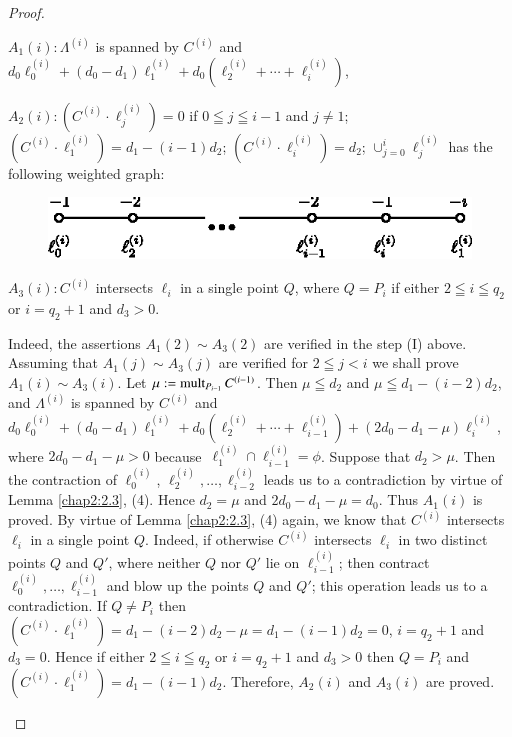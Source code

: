 \begin{proof}
\begin{enumerate}
  $A_{1}(i):\Lambda^{(i)}$ is spanned by $C^{(i)}$ and 
  $d_{0}\ell_{0}^{(i)}+(d_{0}- d_{1})\ell_{1}^{(i)}+
  d_{0}(\ell^{(i)}_{2} +\cdots+\ell_{i}^{(i)})$,  

$A_{2}(i):(C^{(i)}\cdot \ell^{(i)}_{j})=0$ if $0\leqq j\leqq i-1$ and
  $j\neq 1$; $(C^{(i)}\cdot \ell^{(i)}_{1})=d_{1}-(i-1)d_{2}$;
  $(C^{(i)}\cdot \ell^{(i)}_{i})=d_{2}$;
  $\cup^{i}_{j=0}\ell^{(i)}_{j}$ has the following weighted graph:
\begin{figure}[H]
\centering
\includegraphics[scale=1.1]{figures/chap2-fig21.eps}
\end{figure}
\noindent
$A_{3}(i):C^{(i)}$ intersects $\ell_{i}$ in a single point $Q$, where
$Q=P_{i}$ if either $2\leqq i\leqq q_{2}$ or $i=q_{2}+1$ and $d_{3}>0$.

Indeed, the assertions $A_{1}(2)\sim A_{3}(2)$ are verified in the
step (I) above. Assuming that $A_{1}(j)\sim A_{3}(j)$ are verified for
$2\leqq j<i$ we shall prove $A_{1}(i)\sim A_{3}(i)$. Let
$\mu:=\operatorname{mult}_{P_{i-1}}C^{(i-1)}$. Then $\mu\leqq d_{2}$ and $\mu\leqq
d_{1}-(i-2)d_{2}$, and $\Lambda^{(i)}$ is spanned by $C^{(i)}$ and
$d_{0}\ell_{0}^{(i)}+(d_{0}-d_{1})\ell^{(i)}_{1}+d_{0}(\ell^{(i)}_{2}+
\cdots+\ell^{(i)}_{i-1})+(2d_{0}-d_{1}-\mu)\ell^{(i)}_{i}$,
where $2d_{0}-d_{1}-\mu>0$ because\pageoriginale\ $\ell^{(i)}_{1}\cap
\ell^{(i)}_{i-1}=\phi$. Suppose that $d_{2}>\mu$. Then the contraction
of $\ell^{(i)}_{0}$, $\ell^{(i)}_{2},\ldots,\ell^{(i)}_{i-2}$ leads us
to a contradiction by virtue of Lemma \ref{chap2:2.3}, (4). Hence
$d_{2}=\mu$ and $2d_{0}-d_{1}-\mu=d_{0}$. Thus $A_{1}(i)$ is
proved. By virtue of Lemma \ref{chap2:2.3}, (4) again, we know that
$C^{(i)}$ intersects $\ell_{i}$ in a single point $Q$. Indeed, if
otherwise $C^{(i)}$ intersects $\ell_{i}$ in two distinct points $Q$
and $Q'$, where neither $Q$ nor $Q'$ lie on $\ell^{(i)}_{i-1}$; then
contract $\ell^{(i)}_{0},\ldots,\ell^{(i)}_{i-1}$ and blow up the
points $Q$ and $Q'$; this operation leads us to a contradiction. If
$Q\neq P_{i}$ then
$(C^{(i)}\cdot\ell^{(i)}_{1})=d_{1}-(i-2)d_{2}-\mu=d_{1}-(i-1)d_{2}=0$,
\iec $i=q_{2}+1$ and $d_{3}=0$. Hence if either $2\leqq i\leqq q_{2}$
or $i=q_{2}+1$ and $d_{3}>0$ then $Q=P_{i}$ and $(C^{(i)}\cdot
\ell^{(i)}_{1})=d_{1}-(i-1)d_{2}$. Therefore, $A_{2}(i)$ and
$A_{3}(i)$ are proved.


\end{enumerate}
\end{proof}
